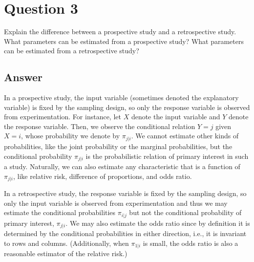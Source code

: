 \documentclass[10pt]{fphw}
\begin{document}
\section*{Question 3}
\begin{problem}
Explain the difference between a prospective study and a retrospective study.
What parameters can be estimated from a prospective study? What parameters can be estimated from a retrospective study?
\end{problem}

\subsection*{Answer}
In a prospective study, the input variable (sometimes denoted the explanatory variable) is fixed by the sampling design,
so only the response variable is observed from experimentation. For instance, let $X$ denote the input variable
and $Y$ denote the response variable. Then, we observe the conditional relation $Y = j$ given $X = i$, whose probability
we denote by $\pi_{j|i}$. We cannot estimate other kinds of probabilities, like the joint probability or the marginal
probabilities, but the conditional probability $\pi_{j|i}$ is the probabilistic relation of primary interest in such a study.
Naturally, we can also estimate any characteristic that is a function of $\pi_{j|i}$, like relative risk,
difference of proportions, and odds ratio.

In a retrospective study, the response variable is fixed by the sampling design, so only the input variable is observed
from experimentation and thus we may estimate the conditional probabilities
$\pi_{i|j}$ but not the conditional probability of primary interest, $\pi_{j|i}$. We may also estimate the odds ratio since
by definition it is determined by the conditional probabilities in either direction, i.e., it is invariant to rows and columns.
(Additionally, when $\pi_{1|i}$ is small, the odds ratio is also a reasonable estimator of the relative risk.)
\end{document}
